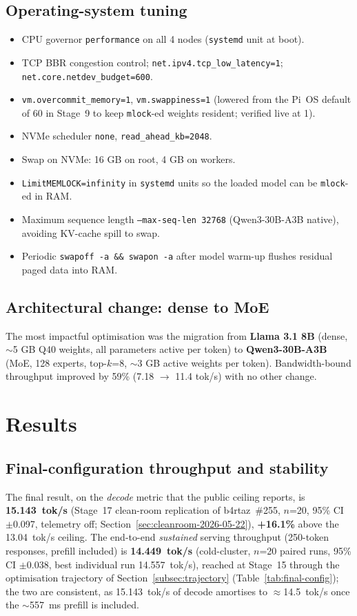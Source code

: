 \documentclass[10pt,a4paper]{article}
\begin{document}
\subsection{Operating-system tuning}
\begin{itemize}
  \item CPU governor \texttt{performance} on all 4 nodes (\texttt{systemd} unit at boot).
  \item TCP BBR congestion control; \texttt{net.ipv4.tcp\_low\_latency=1}; \texttt{net.core.netdev\_budget=600}.
  \item \texttt{vm.overcommit\_memory=1}, \texttt{vm.swappiness=1} (lowered from the Pi~OS default of 60 in Stage~9 to keep \texttt{mlock}-ed weights resident; verified live at 1).
  \item NVMe scheduler \texttt{none}, \texttt{read\_ahead\_kb=2048}.
  \item Swap on NVMe: 16 GB on root, 4 GB on workers.
  \item \texttt{LimitMEMLOCK=infinity} in \texttt{systemd} units so the loaded model can be \texttt{mlock}-ed in RAM.
  \item Maximum sequence length \texttt{--max-seq-len 32768} (Qwen3-30B-A3B native), avoiding KV-cache spill to swap.
  \item Periodic \texttt{swapoff -a \&\& swapon -a} after model warm-up flushes residual paged data into RAM.
\end{itemize}

\subsection{Architectural change: dense to MoE}
The most impactful optimisation was the migration from \textbf{Llama 3.1 8B} (dense, $\sim$5 GB Q40 weights, all parameters active per token) to \textbf{Qwen3-30B-A3B} (MoE, 128 experts, top-$k$=8, $\sim$3 GB active weights per token). Bandwidth-bound throughput improved by 59\% (7.18 $\to$ 11.4 tok/s) with no other change.

\section{Results}

\subsection{Final-configuration throughput and stability}

The final result, on the \emph{decode} metric that the public ceiling reports, is \textbf{15.143~tok/s} (Stage~17 clean-room replication of b4rtaz~\#255, $n$=20, 95\% CI $\pm$0.097, telemetry off; Section~\ref{sec:cleanroom-2026-05-22}), \textbf{+16.1\%} above the 13.04~tok/s ceiling. The end-to-end \emph{sustained} serving throughput (250-token responses, prefill included) is \textbf{14.449~tok/s} (cold-cluster, $n$=20 paired runs, 95\% CI $\pm$0.038, best individual run 14.557~tok/s), reached at Stage~15 through the optimisation trajectory of Section~\ref{subsec:trajectory} (Table~\ref{tab:final-config}); the two are consistent, as 15.143~tok/s of decode amortises to $\approx$14.5~tok/s once the $\sim$557~ms prefill is included.
\end{document}

